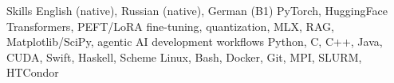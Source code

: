 
\begin{rubric}{Skills}
\entry*[Languages]
    English (native), Russian (native), German (B1)
\entry*[ML \& LLM]
    PyTorch, HuggingFace Transformers, PEFT/LoRA fine-tuning, quantization, MLX, RAG, Matplotlib/SciPy, agentic AI development workflows
\entry*[Programming]
    Python, C, C++, Java, CUDA, Swift, Haskell, Scheme
    Linux, Bash, Docker, Git, MPI, SLURM, HTCondor
\end{rubric}
